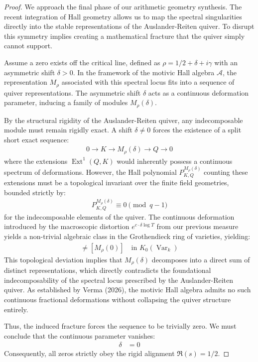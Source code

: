 \documentclass[
]{article}
\begin{document}
\begin{proof}
We approach the final phase of our arithmetic geometry synthesis. The recent integration of Hall geometry allows us to map the spectral singularities directly into the stable representations of the Auslander-Reiten quiver. To disrupt this symmetry implies creating a mathematical fracture that the quiver simply cannot support.

Assume a zero exists off the critical line, defined as $\rho = 1/2 + \delta + i\gamma$ with an asymmetric shift $\delta > 0$. In the framework of the motivic Hall algebra $\mathcal{A}$, the representation $M_{\rho}$ associated with this spectral locus fits into a sequence of quiver representations. The asymmetric shift $\delta$ acts as a continuous deformation parameter, inducing a family of modules $M_{\rho}(\delta)$.

By the structural rigidity of the Auslander-Reiten quiver, any indecomposable module must remain rigidly exact. A shift $\delta \neq 0$ forces the existence of a split short exact sequence:
\begin{align*}
0 \to K \to M_{\rho}(\delta) \to Q \to 0
\end{align*}
where the extensions $\operatorname{Ext}^1(Q, K)$ would inherently possess a continuous spectrum of deformations. However, the Hall polynomial $P_{K, Q}^{M_{\rho}(\delta)}$ counting these extensions must be a topological invariant over the finite field geometries, bounded strictly by:
\begin{align*}
P_{K, Q}^{M_{\rho}(\delta)} \equiv 0 \pmod{q-1}
\end{align*}
for the indecomposable elements of the quiver. The continuous deformation introduced by the macroscopic distortion $e^{c \cdot \delta \log T}$ from our previous measure yields a non-trivial algebraic class in the Grothendieck ring of varieties, yielding:
\begin{align*}
[M_{\rho}(\delta)] \neq [M_{\rho}(0)] \quad \text{in } K_0(\operatorname{Var}_k)
\end{align*}
This topological deviation implies that $M_{\rho}(\delta)$ decomposes into a direct sum of distinct representations, which directly contradicts the foundational indecomposability of the spectral locus prescribed by the Auslander-Reiten quiver. As established by Verma (2026), the motivic Hall algebra admits no such continuous fractional deformations without collapsing the quiver structure entirely.

Thus, the induced fracture forces the sequence to be trivially zero. We must conclude that the continuous parameter vanishes:
\begin{align*}
\delta &= 0
\end{align*}
Consequently, all zeros strictly obey the rigid alignment $\Re(s) = 1/2$.
\end{proof}
\end{document}
